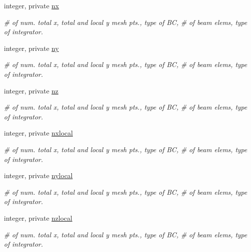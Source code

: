 \textbf{ }\par
\begin{DoxyCompactItemize}
\item 
integer, private \mbox{\hyperlink{namespaceaccsimulatorclass_af61920248f0078da76332ba7c03691f2}{nx}}
\begin{DoxyCompactList}\small\item\em \# of num. total x, total and local y mesh pts., type of BC, \# of beam elems, type of integrator. \end{DoxyCompactList}\item 
integer, private \mbox{\hyperlink{namespaceaccsimulatorclass_a51134373ee457cfeffdc9a5041a4d01c}{ny}}
\begin{DoxyCompactList}\small\item\em \# of num. total x, total and local y mesh pts., type of BC, \# of beam elems, type of integrator. \end{DoxyCompactList}\item 
integer, private \mbox{\hyperlink{namespaceaccsimulatorclass_a56a2e4504ed5d475f38307ecc7360ede}{nz}}
\begin{DoxyCompactList}\small\item\em \# of num. total x, total and local y mesh pts., type of BC, \# of beam elems, type of integrator. \end{DoxyCompactList}\item 
integer, private \mbox{\hyperlink{namespaceaccsimulatorclass_a7f23c64ad80c114ef62069aaede70561}{nxlocal}}
\begin{DoxyCompactList}\small\item\em \# of num. total x, total and local y mesh pts., type of BC, \# of beam elems, type of integrator. \end{DoxyCompactList}\item 
integer, private \mbox{\hyperlink{namespaceaccsimulatorclass_a48f766f48eeb1fb22aeff17c6c81e776}{nylocal}}
\begin{DoxyCompactList}\small\item\em \# of num. total x, total and local y mesh pts., type of BC, \# of beam elems, type of integrator. \end{DoxyCompactList}\item 
integer, private \mbox{\hyperlink{namespaceaccsimulatorclass_af547860c8c8685ee94f4cca4da117acc}{nzlocal}}
\begin{DoxyCompactList}\small\item\em \# of num. total x, total and local y mesh pts., type of BC, \# of beam elems, type of integrator. \end{DoxyCompactList}\item 

\end{DoxyCompactItemize}
